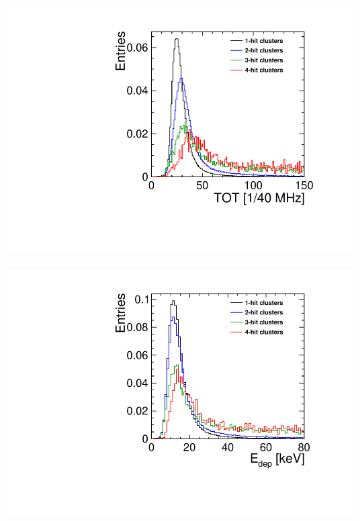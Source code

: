 \begin{figure}[htbp] \centering
  \begin{subfigure}[b]{0.32\textwidth}
    \includegraphics[width=\textwidth]{./figures/Calibration/TOT_Clusters_W0019_C07.pdf}
    \caption{}
  \end{subfigure}\hfill
  \begin{subfigure}[b]{0.32\textwidth}
    \includegraphics[width=\textwidth]{./figures/Calibration/Edep_Clusters_W0019_C07.pdf}
    \caption{}
  \end{subfigure}\hfill
  \begin{subfigure}[b]{0.32\textwidth}

\end{subfigure}
\end{figure}
